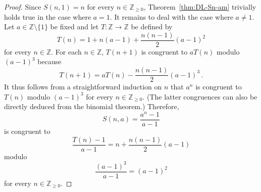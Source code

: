 \documentclass[12pt]{article}
\newcommand{\bZ}{\mathbb{Z}}
\newcommand{\bN}{\bZ_{\ge 0}}%
\theoremstyle{definition}
\begin{document}
 \begin{proof}
   Since $S(n, 1) = n$ for every $n \in \bN$,
   Theorem~\ref{thm:DL-Sn-am} trivially holds true in the case where $a = 1$.
   It remains to deal with the case where $a \ne 1$.
   Let $a \in \bZ \setminus \{ 1 \}$ be fixed and let $T\colon \bZ \to \bZ$ be defined by
   $$
   T(n) =  1 + n (a - 1) + \frac{n(n - 1)}{2} {(a - 1)}^2 
   $$
   for every $n \in \bZ$.
   For each $n \in \bZ$,
   $T(n + 1)$ is congruent to $a T(n)$ modulo ${(a - 1)}^3$ because 
   $$
   T(n + 1) = a T(n) - \frac{n(n - 1)}{2} {(a - 1)}^3 \,.
   $$
   It thus follows from a straightforward induction on $n$ that
   $a^n$ is congruent to $T(n)$ modulo ${(a - 1)}^3$ for every $n \in \bN$.
   (The latter congruences can also be directly deduced from the binomial theorem.)
   Therefore,
   $$S(n, a) = \frac{a^n - 1}{a - 1} %
   $$
   is congruent to
   $$
   \frac{T(n) - 1}{a - 1} = n + \frac{n(n - 1)}{2}  {(a - 1)} 
   $$
   modulo
   $$
   \frac{{(a - 1)}^3}{a - 1} = {(a - 1)}^2
   $$ for every $n \in \bN$.
   
 \end{proof}
\end{document}
